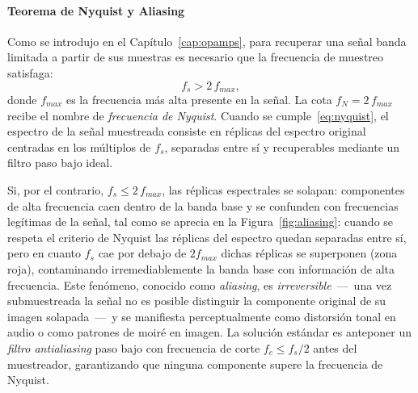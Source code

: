 
\paragraph{Teorema de Nyquist y Aliasing}
Como se introdujo en el Capítulo~\ref{cap:opamps}, para recuperar una señal banda limitada
a partir de sus muestras es necesario que la frecuencia de muestreo satisfaga:
%
\begin{equation}\label{eq:nyquist}
  f_s > 2\,f_{max},
\end{equation}
%
donde $f_{max}$ es la frecuencia más alta presente en la señal.
La cota $f_N = 2\,f_{max}$ recibe el nombre de \emph{frecuencia de Nyquist}.
Cuando se cumple~\eqref{eq:nyquist}, el espectro de la señal muestreada
consiste en réplicas del espectro original centradas en los múltiplos de
$f_s$, separadas entre sí y recuperables mediante un filtro paso bajo ideal.

Si, por el contrario, $f_s \leq 2\,f_{max}$, las réplicas espectrales se
solapan: componentes de alta frecuencia caen dentro de la banda base y se
confunden con frecuencias legítimas de la señal, tal como se aprecia en la
Figura~\ref{fig:aliasing}: cuando se respeta el criterio de Nyquist las
réplicas del espectro quedan separadas entre sí, pero en cuanto $f_s$ cae por
debajo de $2f_{max}$ dichas réplicas se superponen (zona roja), contaminando
irremediablemente la banda base con información de alta frecuencia.
Este fenómeno, conocido como \emph{aliasing}, es \emph{irreversible}~---~una
vez submuestreada la señal no es posible distinguir la componente original de
su imagen solapada~---~y se manifiesta perceptualmente como distorsión tonal
en audio o como patrones de moiré en imagen.
La solución estándar es anteponer un \emph{filtro antialiasing} paso bajo con
frecuencia de corte $f_c \leq f_s/2$ antes del muestreador, garantizando que
ninguna componente supere la frecuencia de Nyquist.

